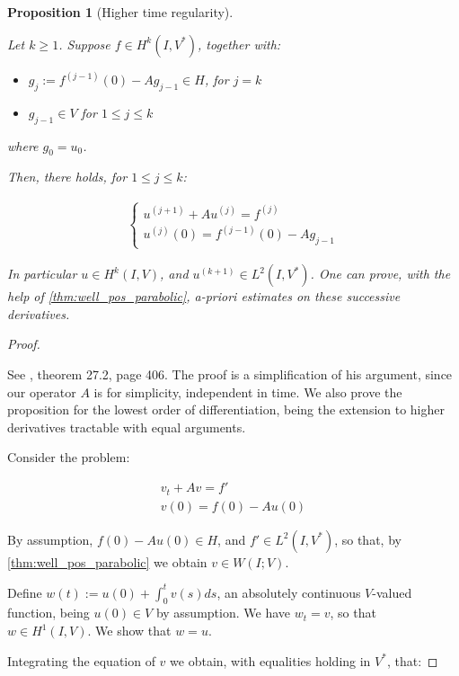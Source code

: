 \documentclass[english,a4paper,9pt,oneside]{scrbook}	%
\theoremstyle{break}
\newtheorem{prop}[equation]{Proposition}
\newenvironment{mproof}[1][\proofname]{%
  \begin{proof}[#1]$ $\par\nobreak\ignorespaces
}{%
  \end{proof}
}
\renewcommand*{\proofname}{Proof}
\theoremstyle{remark}
\newcommand{\ds}{\displaystyle}
\begin{document}
\begin{appendices}
\begin{prop}[Higher time regularity]
\label{prop:time_reg}

Let $k\geq 1$. Suppose $f \in H^k(I, V^*)$, together with:

\begin{itemize}
	\item $g_j:=f^{(j-1)}(0)-Ag_{j-1} \in H$, for $j = k$
	\item $g_{j-1} \in V$ for $1\leq j\leq k$
\end{itemize}

where $g_0 = u_0$.

Then, there holds, for $1\leq j\leq k$:

\begin{align*}
\left\{\begin{matrix}
u^{(j+1)}+Au^{(j)} = f^{(j)}
\\
u^{(j)}(0) = f^{(j-1)}(0) - Ag_{j-1}
\end{matrix}\right.
\end{align*}

In particular $u \in H^k(I,V)$, and $u^{(k+1)} \in L^2(I,V^*)$. One can prove, with the help of \cref{thm:well_pos_parabolic}, a-priori estimates on these successive derivatives.


\end{prop}

\begin{mproof}

See \cite{wloka}, theorem 27.2, page 406. The proof is a simplification of his argument, since our operator $A$ is for simplicity, independent in time. We also prove the proposition for the lowest order of differentiation, being the extension to higher derivatives  tractable with equal arguments.

Consider the problem:

\begin{align*}
	v_t + Av = f'\\
	v(0) = f(0) - Au (0)
\end{align*}

By assumption, $f(0) - Au (0) \in H$, and $f' \in L^2(I,V^*)$, so that, by \cref{thm:well_pos_parabolic} we obtain $v \in W(I;V)$.

Define $w(t):=u(0) + \ds \int_0^tv(s)ds$, an absolutely continuous $V$-valued function, being $u(0) \in V$ by assumption. We have $w_t = v$, so that $w \in H^1(I,V)$. We show that $w = u$.

Integrating the equation of $v$ we obtain, with equalities holding in $V^*$, that:


\end{mproof}
\end{appendices}
\end{document}
